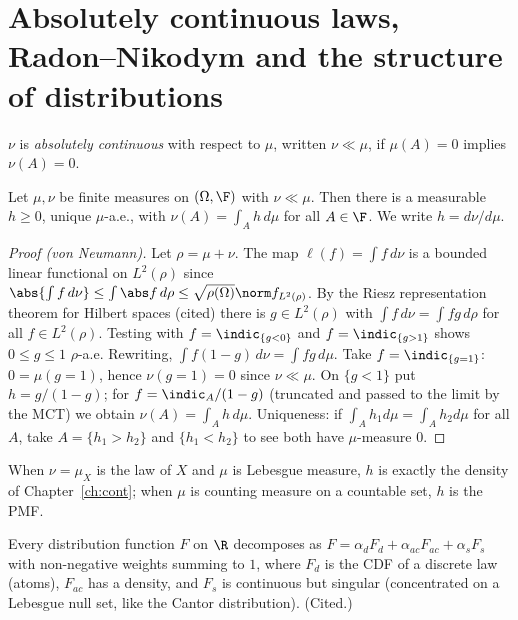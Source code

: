 \section{Absolutely continuous laws, Radon--Nikodym and the structure of distributions}

\begin{definition}
$\nu$ is \emph{absolutely continuous} with respect to $\mu$, written $\nu\ll\mu$, if
$\mu(A)=0$ implies $\nu(A)=0$.
\end{definition}

\begin{theorem}\label{thm:rn}
Let $\mu,\nu$ be finite measures on $(\Omega,\F)$ with $\nu\ll\mu$. Then there is a measurable
$h\ge0$, unique $\mu$-a.e., with $\nu(A)=\int_Ah\,d\mu$ for all $A\in\F$. We write $h=d\nu/d\mu$.
\end{theorem}
\begin{proof}[Proof (von Neumann)]
Let $\rho=\mu+\nu$. The map $\ell(f)=\int f\,d\nu$ is a bounded linear functional on
$L^2(\rho)$ since $\abs{\int f\,d\nu}\le\int\abs f\,d\rho\le\sqrt{\rho(\Omega)}\norm f_{L^2(\rho)}$.
By the Riesz representation theorem for Hilbert spaces (cited) there is $g\in L^2(\rho)$ with
$\int f\,d\nu=\int fg\,d\rho$ for all $f\in L^2(\rho)$. Testing with $f=\indic_{\{g<0\}}$ and
$f=\indic_{\{g>1\}}$ shows $0\le g\le1$ $\rho$-a.e. Rewriting,
$\int f(1-g)\,d\nu=\int fg\,d\mu$. Take $f=\indic_{\{g=1\}}$: $0=\mu(g=1)$, hence
$\nu(g=1)=0$ since $\nu\ll\mu$. On $\{g<1\}$ put $h=g/(1-g)$; for $f=\indic_A/(1-g)$
(truncated and passed to the limit by the MCT) we obtain $\nu(A)=\int_Ah\,d\mu$.
Uniqueness: if $\int_Ah_1d\mu=\int_Ah_2d\mu$ for all $A$, take $A=\{h_1>h_2\}$ and
$\{h_1<h_2\}$ to see both have $\mu$-measure $0$.
\end{proof}

When $\nu=\mu_X$ is the law of $X$ and $\mu$ is Lebesgue measure, $h$ is exactly the density
of Chapter~\ref{ch:cont}; when $\mu$ is counting measure on a countable set, $h$ is the PMF.

\begin{theorem}
Every distribution function $F$ on $\R$ decomposes as
$F=\alpha_dF_d+\alpha_{ac}F_{ac}+\alpha_sF_s$ with non-negative weights summing to $1$, where
$F_d$ is the CDF of a discrete law (atoms), $F_{ac}$ has a density, and $F_s$ is continuous
but singular (concentrated on a Lebesgue null set, like the Cantor distribution). (Cited.)
\end{theorem}

